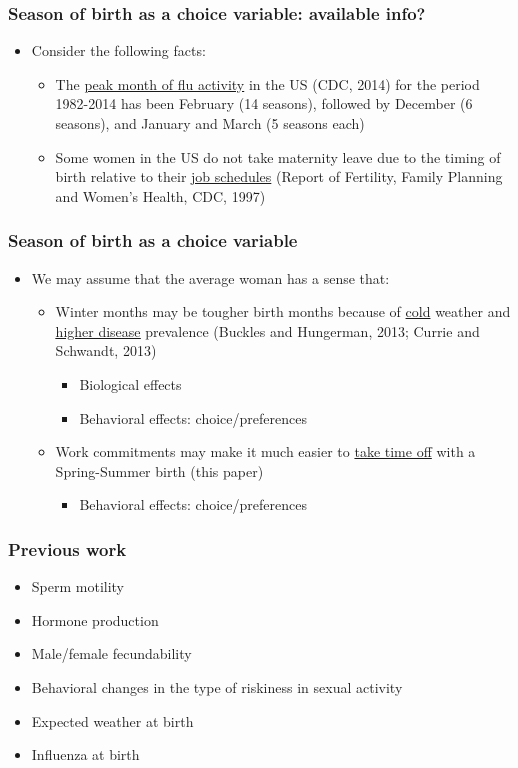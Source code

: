 \documentclass[10pt,letterpaper,subeqn]{beamer}
\begin{document}
\begin{frame}
\frametitle{Season of birth as a choice variable: available info?}
\begin{itemize}
\item Consider the following facts:
\begin{itemize}
\item The \underline{peak month of flu activity} in the US (CDC, 2014) for the period 1982-2014 has been February (14 seasons), followed by December (6 seasons), and January and March (5 seasons each)
\item Some women in the US do not take maternity leave due to the timing of birth relative to their \underline{job schedules} (Report of Fertility, Family Planning and Women's Health, CDC, 1997)
\end{itemize}
\end{itemize}
\end{frame}


\begin{frame}[label=perceptions]
\frametitle{Season of birth as a choice variable}
\begin{itemize}
\item We may assume that the average woman has a sense that:
\begin{itemize}
\item Winter months may be tougher birth months because of \underline{cold} weather and \hyperlink{flu}{\underline{higher disease}} prevalence (Buckles and Hungerman, 2013; Currie and Schwandt, 2013)
\begin{itemize}
\item Biological effects
\item Behavioral effects: choice/preferences
\end{itemize}
\item Work commitments may make it much easier to \underline{take time off} with a Spring-Summer birth (\textcolor[rgb]{1.00,0.00,0.00}{this paper})
\begin{itemize}
\item Behavioral effects: choice/preferences
\end{itemize}
\end{itemize}
\end{itemize}
\end{frame}

\begin{frame}
\frametitle{Previous work}
\begin{itemize}
\item Sperm motility
\item Hormone production
\item Male/female fecundability 
\item Behavioral changes in the type of riskiness in sexual activity
\item Expected weather at birth
\item Influenza at birth
\end{itemize}
\end{frame}
\end{document}
